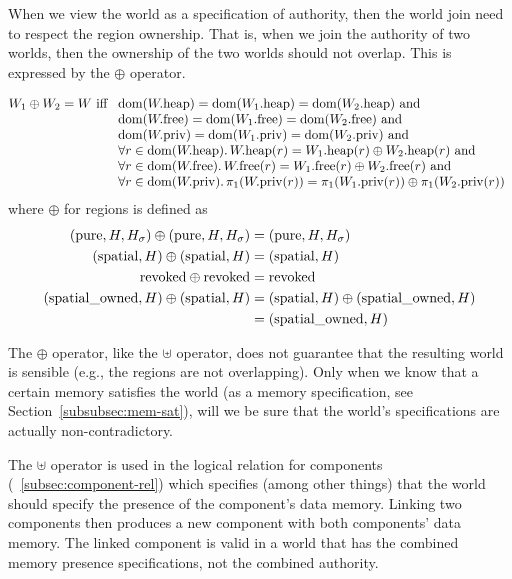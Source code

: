 \begin{jversion}
When we view the world as a specification of authority, then the world join need to respect the region ownership.
That is, when we join the authority of two worlds, then the ownership of the two worlds should not overlap.
This is expressed by the $\oplus$ operator.
\begin{definition}
  \[
    W_1 \oplus W_2 = W
  \text{ iff }
  \begin{array}[t]{l}
    \dom(\pwheap) = \dom(\pwheap[W_1]) = \dom(\pwheap[W_2]) \tand \\
    \dom(\pwfree) = \dom(\pwfree[W_1]) = \dom(\pwfree[W_2]) \tand \\
    \dom(\pwpriv) = \dom(\pwpriv[W_1]) = \dom(\pwpriv[W_2]) \tand \\
    \forall r \in \dom(\pwheap) \ldotp \pwheap(r) = \pwheap[W_1](r) \oplus \pwheap[W_2](r) \tand \\
    \forall r \in \dom(\pwfree) \ldotp \pwfree(r) = \pwfree[W_1](r) \oplus \pwfree[W_2](r) \tand \\
    \forall r \in \dom(\pwpriv) \ldotp \pi_1(\pwpriv(r)) = \pi_1(\pwpriv[W_1](r)) \oplus \pi_1(\pwpriv[W_2](r))
  \end{array}
  \]
  where $\oplus$ for regions is defined as
\begin{align*}
  (\pure,H,H_\sigma) \oplus (\pure,H,H_\sigma) =  & \; (\pure,H,H_\sigma) \\
  (\spatial,H) \oplus (\spatial,H) =  & \; (\spatial,H) \\
  \revoked \oplus \revoked = & \; \revoked \\
  (\spatialo,H) \oplus (\spatial,H) = & \; (\spatial,H) \oplus (\spatialo,H)\\
                                           =  & \; (\spatialo,H)
\end{align*}
\end{definition}
The $\oplus$ operator, like the $\uplus$ operator, does not guarantee that the resulting world is sensible (e.g., the regions are not overlapping).
Only when we know that a certain memory satisfies the world (as a memory specification, see Section~\ref{subsubsec:mem-sat}), will we be sure that the world's specifications are actually non-contradictory.

The $\uplus$ operator is used in the logical relation for components (\sectionname~\ref{subsec:component-rel}) which specifies (among other things) that the world should specify the presence of the component's data memory.
Linking two components then produces a new component with both components' data memory.
The linked component is valid in a world that has the combined memory presence specifications, not the combined authority.


\end{jversion}
